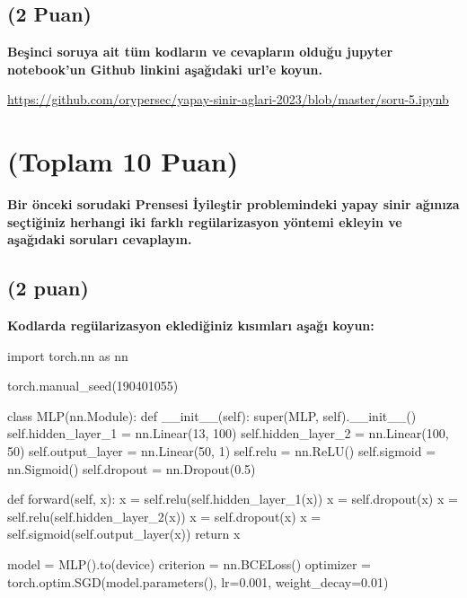 \documentclass[11pt]{article}
\begin{document}

\subsection{(2 Puan)} \textbf{Beşinci soruya ait tüm kodların ve cevapların olduğu jupyter notebook'un Github linkini aşağıdaki url'e koyun.}

\url{https://github.com/orypersec/yapay-sinir-aglari-2023/blob/master/soru-5.ipynb}

\section{(Toplam 10 Puan)} \textbf{Bir önceki sorudaki Prensesi İyileştir problemindeki yapay sinir ağınıza seçtiğiniz herhangi iki farklı regülarizasyon yöntemi ekleyin ve aşağıdaki soruları cevaplayın.} 

\subsection{(2 puan)} \textbf{Kodlarda regülarizasyon eklediğiniz kısımları aşağı koyun:} 

\begin{python}
import torch.nn as nn

torch.manual_seed(190401055)

class MLP(nn.Module):
    def __init__(self):
        super(MLP, self).__init__()
        self.hidden_layer_1 = nn.Linear(13, 100)
        self.hidden_layer_2 = nn.Linear(100, 50)
        self.output_layer = nn.Linear(50, 1)
        self.relu = nn.ReLU()
        self.sigmoid = nn.Sigmoid()
        self.dropout = nn.Dropout(0.5)

    def forward(self, x):
        x = self.relu(self.hidden_layer_1(x))
        x = self.dropout(x)
        x = self.relu(self.hidden_layer_2(x))
        x = self.dropout(x)
        x = self.sigmoid(self.output_layer(x))
        return x

model = MLP().to(device)
criterion = nn.BCELoss()
optimizer = torch.optim.SGD(model.parameters(), lr=0.001, weight_decay=0.01)
\end{python}
\end{document}
